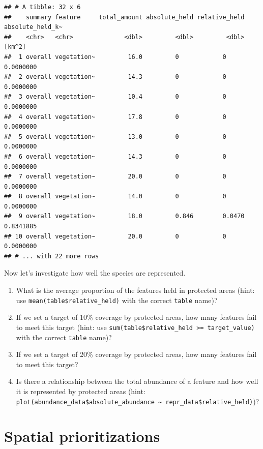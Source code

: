 \documentclass[
  12pt,
]{book}
\makeatletter
\providecommand{\tightlist}{%
  \setlength{\itemsep}{0pt}\setlength{\parskip}{0pt}}
\newenvironment{kframe}{%
\medskip{}
\setlength{\fboxsep}{.8em}
 \def\at@end@of@kframe{}%
 \ifinner\ifhmode%
  \def\at@end@of@kframe{\end{minipage}}%
  \begin{minipage}{\columnwidth}%
 \fi\fi%
 \def\FrameCommand##1{\hskip\@totalleftmargin \hskip-\fboxsep
 \colorbox{shadecolor}{##1}\hskip-\fboxsep
     \hskip-\linewidth \hskip-\@totalleftmargin \hskip\columnwidth}%
 \MakeFramed {\advance\hsize-\width
   \@totalleftmargin\z@ \linewidth\hsize
   \@setminipage}}%
 {\par\unskip\endMakeFramed%
 \at@end@of@kframe}
\newenvironment{rmdblock}[1]
  {
  \begin{itemize}
  \renewcommand{\labelitemi}{
    \raisebox{-.7\height}[0pt][0pt]{
      {\setkeys{Gin}{width=3em,keepaspectratio}\texttt{[image: images/\#1]}}
    }
  }
  \setlength{\fboxsep}{1em}
  \begin{kframe}
  \item
  }
  {
  \end{kframe}
  \end{itemize}
  }
\newenvironment{rmdquestion}
  {\begin{rmdblock}{question}}
  {\end{rmdblock}}
\makeatother
\begin{document}
\begin{verbatim}
## # A tibble: 32 x 6
##    summary feature     total_amount absolute_held relative_held absolute_held_k~
##    <chr>   <chr>              <dbl>         <dbl>         <dbl>           [km^2]
##  1 overall vegetation~         16.0         0            0             0.0000000
##  2 overall vegetation~         14.3         0            0             0.0000000
##  3 overall vegetation~         10.4         0            0             0.0000000
##  4 overall vegetation~         17.8         0            0             0.0000000
##  5 overall vegetation~         13.0         0            0             0.0000000
##  6 overall vegetation~         14.3         0            0             0.0000000
##  7 overall vegetation~         20.0         0            0             0.0000000
##  8 overall vegetation~         14.0         0            0             0.0000000
##  9 overall vegetation~         18.0         0.846        0.0470        0.8341885
## 10 overall vegetation~         20.0         0            0             0.0000000
## # ... with 22 more rows
\end{verbatim}

\clearpage

Now let's investigate how well the species are represented.

\begin{rmdquestion}
\begin{enumerate}
\def\labelenumi{\arabic{enumi}.}
\tightlist
\item
  What is the average proportion of the features held in protected areas (hint: use \texttt{mean(table\$relative\_held)} with the correct \texttt{table} name)?
\item
  If we set a target of 10\% coverage by protected areas, how many features fail to meet this target (hint: use \texttt{sum(table\$relative\_held\ \textgreater{}=\ target\_value)} with the correct \texttt{table} name)?
\item
  If we set a target of 20\% coverage by protected areas, how many features fail to meet this target?
\item
  Is there a relationship between the total abundance of a feature and how well it is represented by protected areas (hint: \texttt{plot(abundance\_data\$absolute\_abundance\ \textasciitilde{}\ repr\_data\$relative\_held)})?
\end{enumerate}
\end{rmdquestion}

\hypertarget{spatial-prioritizations}{%
\chapter{Spatial prioritizations}\label{spatial-prioritizations}}
\end{document}
